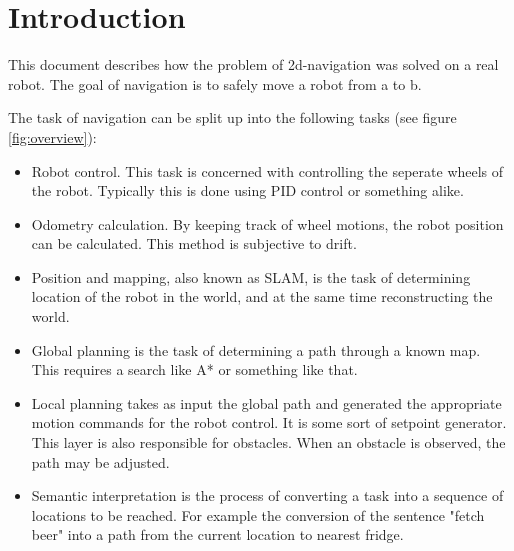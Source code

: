 \documentclass[a4paper]{article}
\begin{document}
\clearpage

\section{Introduction}

This document describes how the problem of 2d-navigation was solved on a real robot.
The goal of navigation is to safely move a robot from a to b.

The task of navigation can be split up into the following tasks (see figure \ref{fig:overview}):

\begin{itemize}
  \item Robot control. This task is concerned with controlling the seperate wheels of the robot.
  Typically this is done using PID control or something alike.
  \item Odometry calculation. By keeping track of wheel motions, the robot position can be
calculated. This method is subjective to drift.
  \item Position and mapping, also known as SLAM, is the task of determining location of the robot in 
  the world, and at the same time reconstructing the world.
  \item Global planning is the task of determining a path through a known map. This requires a search
  like A* or something like that.
  \item Local planning takes as input the global path and generated the appropriate motion commands for
  the robot control. It is some sort of setpoint generator. This layer is also responsible for obstacles.
  When an obstacle is observed, the path may be adjusted.
  \item Semantic interpretation is the process of converting a task into a sequence of locations to be
  reached. For example the conversion of the sentence "fetch beer" into a path from the current location
  to nearest fridge.
\end{itemize}
\end{document}
